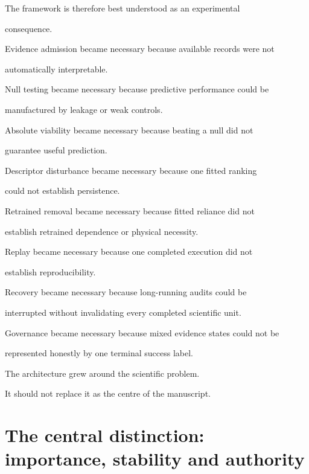 \documentclass[11pt,a4paper,oneside]{report}
\begin{document}
The framework is therefore best understood as an experimental

consequence.



Evidence admission became necessary because available records were not

automatically interpretable.



Null testing became necessary because predictive performance could be

manufactured by leakage or weak controls.



Absolute viability became necessary because beating a null did not

guarantee useful prediction.



Descriptor disturbance became necessary because one fitted ranking

could not establish persistence.



Retrained removal became necessary because fitted reliance did not

establish retrained dependence or physical necessity.



Replay became necessary because one completed execution did not

establish reproducibility.



Recovery became necessary because long-running audits could be

interrupted without invalidating every completed scientific unit.



Governance became necessary because mixed evidence states could not be

represented honestly by one terminal success label.



The architecture grew around the scientific problem.



It should not replace it as the centre of the manuscript.



\section{The central distinction: importance, stability and authority}
\end{document}
